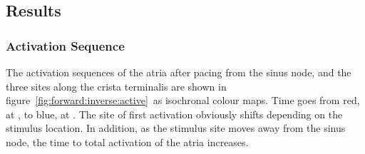 \subsection{Results}

\subsubsection{Activation Sequence}

The activation sequences of the atria after pacing from the sinus node, and the
three sites along the crista terminalis are shown in
figure~\ref{fig:forward:inverse:active}\ as isochronal colour maps.
Time goes from red, at , to blue, at .
The site of first activation obviously shifts depending on the stimulus
location.
In addition, as the stimulus site moves away from the sinus node, the time to
total activation of the atria increases.

